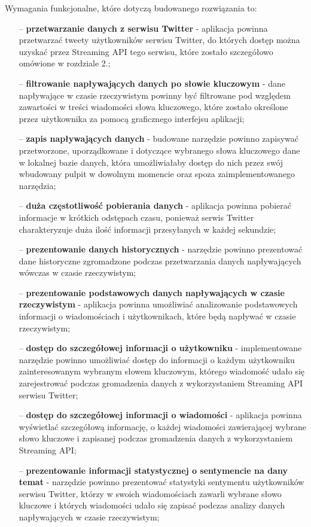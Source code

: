 Wymagania funkcjonalne, które dotyczą budowanego rozwiązania to: 
\begin{itemize}
	\item[--] \textbf{przetwarzanie danych z serwisu Twitter} - aplikacja powinna przetwarzać tweety użytkowników serwisu Twitter, do których dostęp można uzyskać przez Streaming API tego serwisu, które zostało szczegółowo omówione w rozdziale 2.; 
	\item[--] \textbf{filtrowanie napływających danych po słowie kluczowym} - dane napływające w czasie rzeczywistym powinny być filtrowane pod względem zawartości w treści wiadomości słowa kluczowego, które zostało określone przez użytkownika za pomocą graficznego interfejsu aplikacji;
	\item[--] \textbf{zapis napływających danych} - budowane narzędzie powinno zapisywać przetworzone, uporządkowane i dotyczące wybranego słowa kluczowego dane w lokalnej bazie danych, która umożliwiałaby dostęp do nich przez swój wbudowany pulpit w dowolnym momencie oraz spoza zaimplementowanego narzędzia;
	\item[--] \textbf{duża częstotliwość pobierania danych} - aplikacja powinna pobierać informacje w krótkich odstępach czasu, ponieważ serwis Twitter charakteryzuje duża ilość informacji przesyłanych w każdej sekundzie;
	\item[--] \textbf{prezentowanie danych historycznych} - narzędzie powinno prezentować dane historyczne zgromadzone podczas przetwarzania danych napływających wówczas w czasie rzeczywistym;
	\item[--] \textbf{prezentowanie podstawowych danych napływających w czasie rzeczywistym} - aplikacja powinna umożliwiać analizowanie podstawowych informacji o wiadomościach i użytkownikach, które będą napływać w czasie rzeczywistym;
	\item[--] \textbf{dostęp do szczegółowej informacji o użytkowniku} - implementowane narzędzie powinno umożliwiać dostęp do informacji o każdym użytkowniku zainteresowanym wybranym słowem kluczowym, którego wiadomość udało się zarejestrować podczas gromadzenia danych z wykorzystaniem Streaming API serwisu Twitter;
	\item[--] \textbf{dostęp do szczegółowej informacji o wiadomości} - aplikacja powinna wyświetlać szczegółową informację, o każdej wiadomości zawierającej wybrane słowo kluczowe i zapisanej podczas gromadzenia danych z wykorzystaniem Streaming API;
	\item[--] \textbf{prezentowanie informacji statystycznej o sentymencie na dany temat} - narzędzie powinno prezentować statystyki sentymentu użytkowników serwisu Twitter, którzy w swoich wiadomościach zawarli wybrane słowo kluczowe i których wiadomości udało się zapisać podczas analizy danych napływających w czasie rzeczywistym;

\end{itemize}
